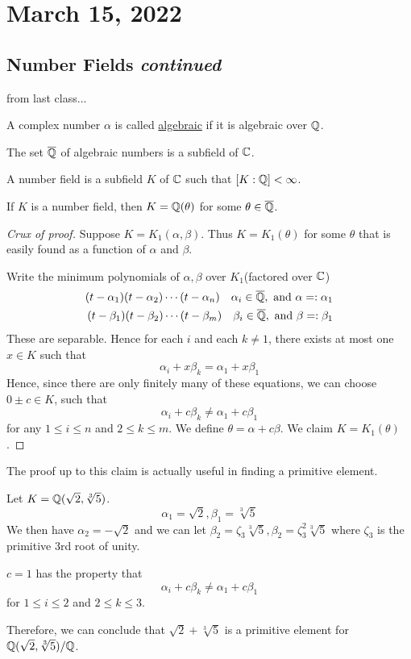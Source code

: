 \section{March 15, 2022}
\subsection{Number Fields \emph{continued}}
\recall from last class...
\begin{definition*}
    A complex number $\alpha$ is called \ul{algebraic} if it is algebraic over $\mathbb Q$.
\end{definition*}
\begin{proposition*}
    The set $\overline{\mathbb Q}$ of algebraic numbers is a subfield of $\mathbb C$.
\end{proposition*}
\begin{definition*}
    A number field is a subfield $K$ of $\mathbb C$ such that $[K: \mathbb Q]<\infty$.
\end{definition*}
\begin{theorem*}
    If $K$ is a number field, then $K = \mathbb Q(\theta)$ for some $\theta\in \overline{\mathbb Q}$.
\end{theorem*}
\begin{proof}[Crux of proof]
    Suppose $K = K_1(\alpha, \beta)$. Thus $K = K_1(\theta)$ for some $\theta$ that is easily found as a function of $\alpha$ and $\beta$.

    Write the minimum polynomials of $\alpha, \beta$ over $K_1$(factored over $\mathbb C$)
    \begin{align*}
        (t-\alpha_1)(t-\alpha_2)\cdots (t-\alpha_n)\quad \alpha_i\in\overline{\mathbb Q}, \text{ and }\alpha =: \alpha_1 \\
        (t-\beta_1)(t-\beta_2)\cdots (t-\beta_m)\quad \beta_i\in\overline{\mathbb Q}, \text{ and }\beta =: \beta_1
    \end{align*}
    These are separable. Hence for each $i$ and each $k\neq 1$, there exists at most one $x\in K$ such that
    \[\alpha_i + x\beta_k = \alpha_1 + x\beta_1\]
    Hence, since there are only finitely many of these equations, we can choose $0\pm c\in K$, such that
    \[\alpha_i + c\beta_k \neq \alpha_1 + c\beta_1\]
    for any $1\leq i\leq n$ and $2\leq k\leq m$. We define $\theta = \alpha + c\beta$. We claim $K = K_1(\theta)$.
\end{proof}
The proof up to this claim is actually useful in finding a primitive element.
\begin{example}
    Let $K = \mathbb Q(\sqrt{2}, \sqrt[3]{5})$.
    \[\alpha_1 = \sqrt{2}, \beta_1 = \sqrt[3]{5}\]
    We then have $\alpha_2 = -\sqrt{2}$ and we can let $\beta_2 = \zeta_3\sqrt[3]{5}, \beta_2 = \zeta_3^2\sqrt[3]{5}$ where $\zeta_3$ is the primitive 3rd root of unity.

    $c = 1$ has the property that
    \[\alpha_i + c\beta_k \neq \alpha_1 + c\beta_1\]
    for $1\leq i\leq 2$ and $2\leq k\leq 3$.

    Therefore, we can conclude that $\sqrt{2} + \sqrt[3]{5}$ is a primitive element for $\mathbb Q(\sqrt{2}, \sqrt[3]{5})/\mathbb Q$.
\end{example}

